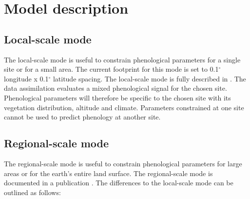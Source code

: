 \documentclass[a4paper,12pt]{article}
\newcommand{\degree}{$^{\circ}$ }
\begin{document}
\section{Model description}

\subsection{Local-scale mode}
The local-scale mode is useful to constrain phenological parameters for a single site or for a small area. The current footprint for this mode is set to 0.1\degree longitude x 0.1\degree latitude spacing. The local-scale mode is fully described in \cite{Stockli2008}. The data assimilation evaluates a mixed phenological signal for the chosen site. Phenological parameters will therefore be specific to the chosen site with its vegetation distribution, altitude and climate. Parameters constrained at one site cannot be used to predict phenology at another site.

\subsection{Regional-scale mode}
The regional-scale mode is useful to constrain phenological parameters for large areas or for the earth's entire land surface. The regional-scale mode is documented in a publication \citep{Stockli2011}. The differences to the local-scale mode can be outlined as follows:
\end{document}
